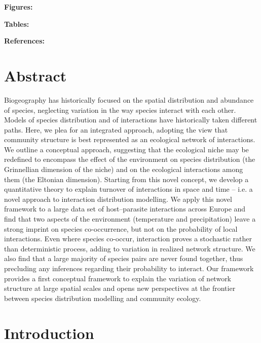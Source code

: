 \documentclass[12pt]{article}
\begin{document}
\textbf{Figures:} 

\textbf{Tables:}     

\textbf{References:} 

\newpage
\doublespacing

\section*{Abstract} 

Biogeography has historically focused on the spatial distribution and
abundance of species, neglecting variation in the way species interact with
each other. Models of species distribution and of interactions have
historically taken different paths. Here, we plea for an integrated approach,
adopting the view that community structure is best represented as an
ecological network of interactions. We outline a conceptual approach,
suggesting that the ecological niche may be redefined to encompass the effect
of the environment on species distribution (the Grinnellian dimension of the
niche) and on the ecological interactions among them (the Eltonian dimension).
Starting from this novel concept, we develop a quantitative theory to explain
turnover of interactions in space and time – i.e. a novel approach to
interaction distribution modelling. We apply this novel framework to a large
data set of host–parasite interactions across Europe and find that two aspects
of the environment (temperature and precipitation) leave a strong imprint on
species co-occurrence, but not on the probability of local interactions. Even
where species co-occur, interaction proves a stochastic rather than
deterministic process, adding to variation in realized network structure. We
also find that a large majority of species pairs are never found together,
thus precluding any inferences regarding their probability to interact. Our
framework provides a first conceptual framework to explain the variation of
network structure at large spatial scales and opens new perspectives at the
frontier between species distribution modelling and community ecology.

\newpage

\section*{Introduction}
\end{document}
